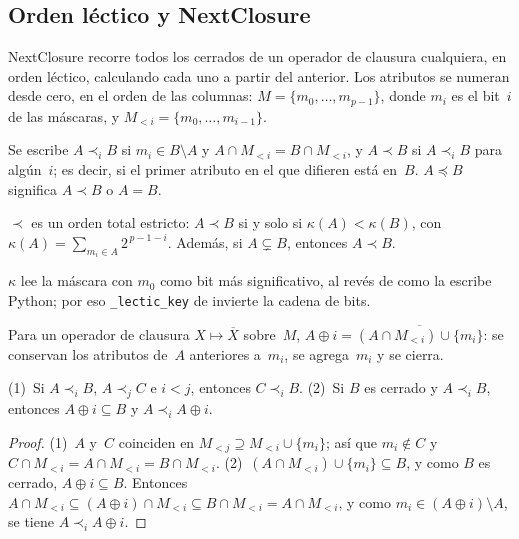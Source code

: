 \subsection{Orden léctico y NextClosure}
\label{sec:nextclosure}

NextClosure \parencite{ganter2010} recorre todos los cerrados de un operador de clausura cualquiera, en orden léctico, calculando cada uno a partir del anterior. Los atributos se numeran desde cero, en el orden de las columnas: $M = \{m_0, \dots, m_{p-1}\}$, donde $m_i$ es el bit~$i$ de las máscaras, y $M_{<i} = \{m_0, \dots, m_{i-1}\}$.

\begin{definicion}\label{def:lectico}
Se escribe $A \prec_i B$ si $m_i \in B \setminus A$ y $A \cap M_{<i} = B \cap M_{<i}$, y $A \prec B$ si $A \prec_i B$ para algún~$i$; es decir, si el primer atributo en el que difieren está en~$B$. $A \preceq B$ significa $A \prec B$ o $A = B$.
\end{definicion}

\begin{proposicion}\label{prop:lectico}
$\prec$ es un orden total estricto: $A \prec B$ si y solo si $\kappa(A) < \kappa(B)$, con $\kappa(A) = \sum_{m_i \in A} 2^{\,p-1-i}$. Además, si $A \subsetneq B$, entonces $A \prec B$.
\end{proposicion}

$\kappa$ lee la máscara con $m_0$ como bit más significativo, al revés de como la escribe Python; por eso \texttt{\_lectic\_key} de  invierte la cadena de bits.

\begin{definicion}\label{def:oplus}
Para un operador de clausura $X \mapsto \overline{X}$ sobre~$M$, $A \oplus i = \overline{(A \cap M_{<i}) \cup \{m_i\}}$: se conservan los atributos de~$A$ anteriores a~$m_i$, se agrega~$m_i$ y se cierra.
\end{definicion}

\begin{lema}\label{lem:oplus}
(1)~Si $A \prec_i B$, $A \prec_j C$ e $i < j$, entonces $C \prec_i B$. (2)~Si $B$ es cerrado y $A \prec_i B$, entonces $A \oplus i \subseteq B$ y $A \prec_i A \oplus i$.
\end{lema}

\begin{proof}
(1)~$A$ y~$C$ coinciden en $M_{<j} \supseteq M_{<i} \cup \{m_i\}$; así que $m_i \notin C$ y $C \cap M_{<i} = A \cap M_{<i} = B \cap M_{<i}$. (2)~$(A \cap M_{<i}) \cup \{m_i\} \subseteq B$, y como $B$ es cerrado, $A \oplus i \subseteq B$. Entonces $A \cap M_{<i} \subseteq (A \oplus i) \cap M_{<i} \subseteq B \cap M_{<i} = A \cap M_{<i}$, y como $m_i \in (A \oplus i) \setminus A$, se tiene $A \prec_i A \oplus i$.
\end{proof}


